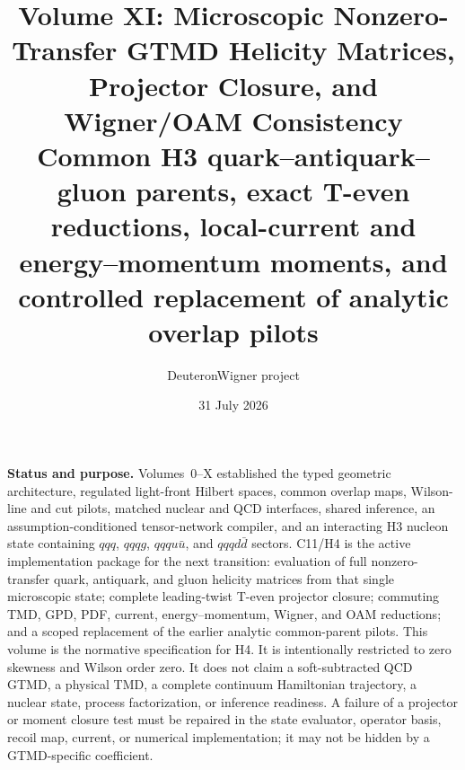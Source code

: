 \documentclass[11pt]{article}
\title{\vspace{-1.0cm}
{\color{navy}\bfseries Volume XI: Microscopic Nonzero-Transfer GTMD Helicity Matrices,\\[2mm]
Projector Closure, and Wigner/OAM Consistency}\\[4mm]
\large Common H3 quark--antiquark--gluon parents, exact T-even reductions,
local-current and energy--momentum moments, and controlled replacement of
analytic overlap pilots}
\author{DeuteronWigner project}
\date{31 July 2026}
\begin{document}
\maketitle

\begin{center}
\begin{minipage}{0.94\textwidth}
\colorbox{softblue}{\parbox{0.96\textwidth}{
\textbf{Status and purpose.}
Volumes~0--X established the typed geometric architecture, regulated
light-front Hilbert spaces, common overlap maps, Wilson-line and cut pilots,
matched nuclear and QCD interfaces, shared inference, an assumption-conditioned
tensor-network compiler, and an interacting H3 nucleon state containing
\(qqq\), \(qqqg\), \(qqqu\bar u\), and \(qqqd\bar d\) sectors.  C11/H4 is
the active implementation package for the next transition: evaluation of
full nonzero-transfer quark, antiquark, and gluon helicity matrices from that
single microscopic state; complete leading-twist T-even projector closure;
commuting TMD, GPD, PDF, current, energy--momentum, Wigner, and OAM reductions;
and a scoped replacement of the earlier analytic common-parent pilots.  This
volume is the normative specification for H4.  It is intentionally restricted
to zero skewness and Wilson order zero.  It does not claim a soft-subtracted
QCD GTMD, a physical TMD, a complete continuum Hamiltonian trajectory, a
nuclear state, process factorization, or inference readiness.  A failure of a
projector or moment closure test must be repaired in the state evaluator,
operator basis, recoil map, current, or numerical implementation; it may not
be hidden by a GTMD-specific coefficient.
}}
\end{minipage}
\end{center}
\end{document}
